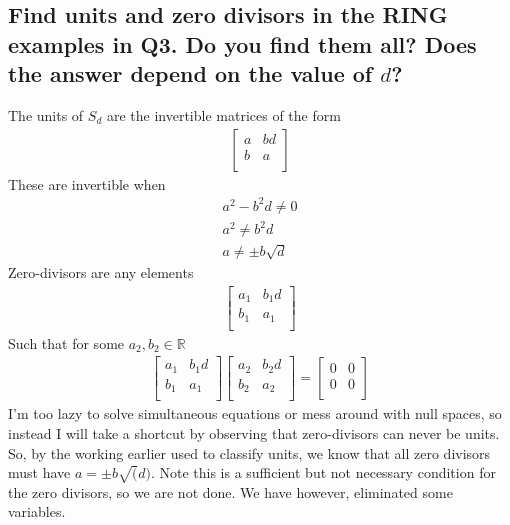 \documentclass{article}
\begin{document}
\subsection*{Find units and zero divisors in the RING examples in Q3. Do you find them all? Does the answer depend on the value of \(d\)?}
\solution
The units of \(S_d\) are the invertible matrices of the form
\begin{align*}
\left[ {\begin{array}{cc}
   a & bd \\
   b & a \\
  \end{array} } \right]
\end{align*}
These are invertible when
\begin{align*}
a^2 - b^2 d \neq 0\\
a^2 \neq b^2 d\\
a \neq \pm b\sqrt{d}
\end{align*}
Zero-divisors are any elements
\begin{align*}
\left[ {\begin{array}{cc}
   a_1 & b_1 d \\
   b_1 & a_1 \\
  \end{array} } \right]
\end{align*}
Such that for some \(a_2, b_2 \in \mathds{R}\)
\begin{align*}
\left[ {\begin{array}{cc}
   a_1 & b_1 d \\
   b_1 & a_1 \\
  \end{array} } \right] 
  \left[ {\begin{array}{cc}
   a_2 & b_2 d \\
   b_2 & a_2 \\
  \end{array} } \right] = 
  \left[ {\begin{array}{cc}
   0 & 0 \\
   0 & 0 \\
  \end{array} } \right]
\end{align*}
I'm too lazy to solve simultaneous equations or mess around with null spaces, so instead I will take a shortcut by observing that zero-divisors can never be units. So, by the working earlier used to classify units, we know that all zero divisors must have \(a = \pm b\sqrt(d)\). Note this is a sufficient but not necessary condition for the zero divisors, so we are not done. We have however, eliminated some variables.
\end{document}
